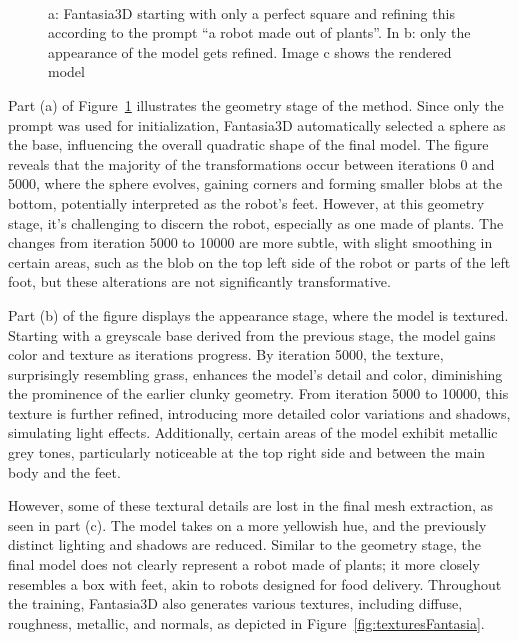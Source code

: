 \begin{figure}[ht]
\begin{subfigure}[b]{0.37\textwidth}
        \caption{}
    \end{subfigure}
    \caption{a: Fantasia3D starting with only a perfect square and refining this according to the prompt ``a robot made out of plants''. In b: only the appearance of the model gets refined. Image c shows the rendered model }~\label{fig:generationFantasia}
\end{figure}

Part (a) of Figure~\ref{fig:generationFantasia} illustrates the geometry stage of the method. Since only the prompt was used for initialization, Fantasia3D automatically selected a sphere as the base, influencing the overall quadratic shape of the final model. The figure reveals that the majority of the transformations occur between iterations 0 and 5000, where the sphere evolves, gaining corners and forming smaller blobs at the bottom, potentially interpreted as the robot's feet. However, at this geometry stage, it's challenging to discern the robot, especially as one made of plants. The changes from iteration 5000 to 10000 are more subtle, with slight smoothing in certain areas, such as the blob on the top left side of the robot or parts of the left foot, but these alterations are not significantly transformative.

Part (b) of the figure displays the appearance stage, where the model is textured. Starting with a greyscale base derived from the previous stage, the model gains color and texture as iterations progress. By iteration 5000, the texture, surprisingly resembling grass, enhances the model's detail and color, diminishing the prominence of the earlier clunky geometry. From iteration 5000 to 10000, this texture is further refined, introducing more detailed color variations and shadows, simulating light effects. Additionally, certain areas of the model exhibit metallic grey tones, particularly noticeable at the top right side and between the main body and the feet. 

However, some of these textural details are lost in the final mesh extraction, as seen in part (c). The model takes on a more yellowish hue, and the previously distinct lighting and shadows are reduced. Similar to the geometry stage, the final model does not clearly represent a robot made of plants; it more closely resembles a box with feet, akin to robots designed for food delivery. Throughout the training, Fantasia3D also generates various textures, including diffuse, roughness, metallic, and normals, as depicted in Figure~\ref{fig:texturesFantasia}.


